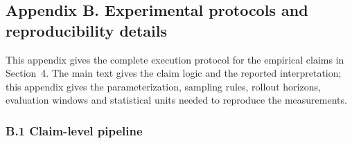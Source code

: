 \subsection*{Appendix B. Experimental protocols and reproducibility details}
\label{appendix:protocols}

This appendix gives the complete execution protocol for the empirical claims in Section~4.  The main text gives the claim logic and the reported interpretation; this appendix gives the parameterization, sampling rules, rollout horizons, evaluation windows and statistical units needed to reproduce the measurements.

\subsubsection*{B.1 Claim-level pipeline}

